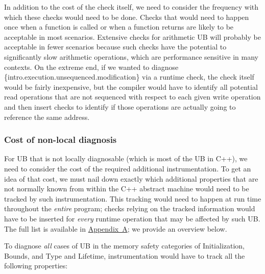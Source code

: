 {In addition to the cost of the check itself, we need to consider the frequency with which these checks would need to be done. Checks that would need to happen once when a function is called or when a function returns are likely to be acceptable in most scenarios. Extensive checks for arithmetic UB will probably be acceptable in fewer scenarios because such checks have the potential to significantly slow arithmetic operations, which are performance sensitive in many contexts. On the extreme end, if we wanted to diagnose \{intro.execution.unsequenced.modification\} via a runtime check, the check itself would be fairly inexpensive, but the compiler would have to identify all potential read operations that are not sequenced with respect to each given write operation and then insert checks to identify if those operations are actually going to reference the same address.

\subsubsection{Cost of non-local diagnosis}
\label{cost_nonlocal}

For UB that is not locally diagnosable (which is most of the UB in C++), we need to consider the cost of the required additional instrumentation. To get an idea of that cost, we must nail down exactly which additional properties that are not normally known from within the C++ abstract machine would need to be tracked by such instrumentation. This tracking would need to happen at run time throughout the \emph{entire} program; checks relying on the tracked information would have to be inserted for \emph{every} runtime operation that may be affected by such UB.
The full list is available in \hyperref[appendix]{Appendix~A}; we provide an overview below.

To diagnose \emph{all} cases of UB in the memory safety categories of Initialization, Bounds, and Type and Lifetime, instrumentation would have to track all the following properties:

}

